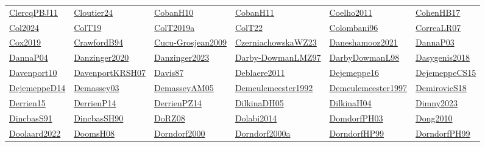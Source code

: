 \begin{longtable}{*{6}{l}}
\hyperref[detail:ClercqPBJ11]{ClercqPBJ11} & \hyperref[detail:Cloutier24]{Cloutier24} & \hyperref[detail:CobanH10]{CobanH10} & \hyperref[detail:CobanH11]{CobanH11} & \hyperref[detail:Coelho2011]{Coelho2011} & \hyperref[detail:CohenHB17]{CohenHB17}\\ 
\hyperref[detail:Col2024]{Col2024} & \hyperref[detail:ColT19]{ColT19} & \hyperref[detail:ColT2019a]{ColT2019a} & \hyperref[detail:ColT22]{ColT22} & \hyperref[detail:Colombani96]{Colombani96} & \hyperref[detail:CorreaLR07]{CorreaLR07}\\ 
\hyperref[detail:Cox2019]{Cox2019} & \hyperref[detail:CrawfordB94]{CrawfordB94} & \hyperref[detail:Cucu-Grosjean2009]{Cucu-Grosjean2009} & \hyperref[detail:CzerniachowskaWZ23]{CzerniachowskaWZ23} & \hyperref[detail:Daneshamooz2021]{Daneshamooz2021} & \hyperref[detail:DannaP03]{DannaP03}\\ 
\hyperref[detail:DannaP04]{DannaP04} & \hyperref[detail:Danzinger2020]{Danzinger2020} & \hyperref[detail:Danzinger2023]{Danzinger2023} & \hyperref[detail:Darby-DowmanLMZ97]{Darby-DowmanLMZ97} & \hyperref[detail:DarbyDowmanL98]{DarbyDowmanL98} & \hyperref[detail:Dasygenis2018]{Dasygenis2018}\\ 
\hyperref[detail:Davenport10]{Davenport10} & \hyperref[detail:DavenportKRSH07]{DavenportKRSH07} & \hyperref[detail:Davis87]{Davis87} & \hyperref[detail:Deblaere2011]{Deblaere2011} & \hyperref[detail:Dejemeppe16]{Dejemeppe16} & \hyperref[detail:DejemeppeCS15]{DejemeppeCS15}\\ 
\hyperref[detail:DejemeppeD14]{DejemeppeD14} & \hyperref[detail:Demassey03]{Demassey03} & \hyperref[detail:DemasseyAM05]{DemasseyAM05} & \hyperref[detail:Demeulemeester1992]{Demeulemeester1992} & \hyperref[detail:Demeulemeester1997]{Demeulemeester1997} & \hyperref[detail:DemirovicS18]{DemirovicS18}\\ 
\hyperref[detail:Derrien15]{Derrien15} & \hyperref[detail:DerrienP14]{DerrienP14} & \hyperref[detail:DerrienPZ14]{DerrienPZ14} & \hyperref[detail:DilkinaDH05]{DilkinaDH05} & \hyperref[detail:DilkinaH04]{DilkinaH04} & \hyperref[detail:Dimny2023]{Dimny2023}\\ 
\hyperref[detail:DincbasS91]{DincbasS91} & \hyperref[detail:DincbasSH90]{DincbasSH90} & \hyperref[detail:DoRZ08]{DoRZ08} & \hyperref[detail:Dolabi2014]{Dolabi2014} & \hyperref[detail:DomdorfPH03]{DomdorfPH03} & \hyperref[detail:Dong2010]{Dong2010}\\ 
\hyperref[detail:Doolaard2022]{Doolaard2022} & \hyperref[detail:DoomsH08]{DoomsH08} & \hyperref[detail:Dorndorf2000]{Dorndorf2000} & \hyperref[detail:Dorndorf2000a]{Dorndorf2000a} & \hyperref[detail:DorndorfHP99]{DorndorfHP99} & \hyperref[detail:DorndorfPH99]{DorndorfPH99}\\ 

\end{longtable}
